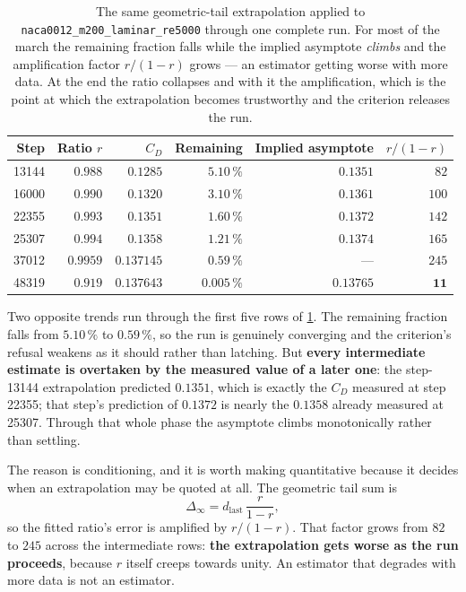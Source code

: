 \begin{table}[htbp]
  \centering
  \caption{The same geometric-tail extrapolation applied to
  \texttt{naca0012\_m200\_laminar\_re5000} through one complete run. For most of the march
  the remaining fraction falls while the implied asymptote \emph{climbs} and the
  amplification factor $r/(1-r)$ grows --- an estimator getting worse with more data. At
  the end the ratio collapses and with it the amplification, which is the point at which
  the extrapolation becomes trustworthy and the criterion releases the run.}
  \label{tab:conditioning}
  \small
  \begin{tabular}{rrrrrr}
    \toprule
    Step & Ratio $r$ & $C_D$ & Remaining & Implied asymptote & $r/(1-r)$ \\
    \midrule
    \num{13144} & $0.988$ & $0.1285$ & $5.10\,\%$ & $0.1351$ & $82$ \\
    \num{16000} & $0.990$ & $0.1320$ & $3.10\,\%$ & $0.1361$ & $100$ \\
    \num{22355} & $0.993$ & $0.1351$ & $1.60\,\%$ & $0.1372$ & $142$ \\
    \num{25307} & $0.994$ & $0.1358$ & $1.21\,\%$ & $0.1374$ & $165$ \\
    \num{37012} & $0.9959$ & $0.137145$ & $0.59\,\%$ & --- & $245$ \\
    \midrule
    \num{48319} & $\mathbf{0.919}$ & $0.137643$ & $\mathbf{0.005\,\%}$ & $0.13765$
      & $\mathbf{11}$ \\
    \bottomrule
  \end{tabular}
\end{table}

Two opposite trends run through the first five rows of \cref{tab:conditioning}. The
remaining fraction falls from $5.10\,\%$ to $0.59\,\%$, so the run is genuinely converging
and the criterion's refusal weakens as it should rather than latching. But
\textbf{every intermediate estimate is overtaken by the measured value of a later one}:
the step-\num{13144} extrapolation predicted $0.1351$, which is exactly the $C_D$ measured
at step \num{22355}; that step's prediction of $0.1372$ is nearly the $0.1358$ already
measured at \num{25307}. Through that whole phase the asymptote climbs monotonically
rather than settling.

The reason is conditioning, and it is worth making quantitative because it decides when an
extrapolation may be quoted at all. The geometric tail sum is
\begin{equation}
  \Delta_\infty = d_{\text{last}}\,\frac{r}{1-r},
  \label{eq:tailsum}
\end{equation}
so the fitted ratio's error is amplified by $r/(1-r)$. That factor grows from $82$ to $245$
across the intermediate rows: \textbf{the extrapolation gets worse as the run proceeds},
because $r$ itself creeps towards unity. An estimator that degrades with more data is not
an estimator.

